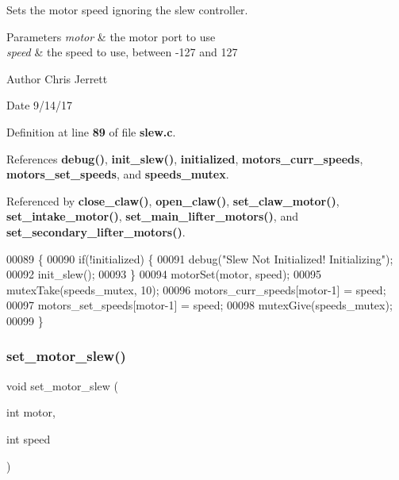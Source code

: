 Sets the motor speed ignoring the slew controller. 


\begin{DoxyParams}{Parameters}
{\em motor} & the motor port to use \\
\hline
{\em speed} & the speed to use, between -\/127 and 127 \\
\hline
\end{DoxyParams}
\begin{DoxyAuthor}{Author}
Chris Jerrett 
\end{DoxyAuthor}
\begin{DoxyDate}{Date}
9/14/17 
\end{DoxyDate}


Definition at line \textbf{ 89} of file \textbf{ slew.\+c}.



References \textbf{ debug()}, \textbf{ init\+\_\+slew()}, \textbf{ initialized}, \textbf{ motors\+\_\+curr\+\_\+speeds}, \textbf{ motors\+\_\+set\+\_\+speeds}, and \textbf{ speeds\+\_\+mutex}.



Referenced by \textbf{ close\+\_\+claw()}, \textbf{ open\+\_\+claw()}, \textbf{ set\+\_\+claw\+\_\+motor()}, \textbf{ set\+\_\+intake\+\_\+motor()}, \textbf{ set\+\_\+main\+\_\+lifter\+\_\+motors()}, and \textbf{ set\+\_\+secondary\+\_\+lifter\+\_\+motors()}.


\begin{DoxyCode}
00089                                                \{
00090   \textcolor{keywordflow}{if}(!initialized) \{
00091     debug(\textcolor{stringliteral}{"Slew Not Initialized! Initializing"});
00092     init_slew();
00093   \}
00094   motorSet(motor, speed);
00095   mutexTake(speeds_mutex, 10);
00096   motors_curr_speeds[motor-1] = speed;
00097   motors_set_speeds[motor-1] = speed;
00098   mutexGive(speeds_mutex);
00099 \}
\end{DoxyCode}
\mbox{\label{slew_8c_a7dff2b79dffe55fb936d977594d7c01d}} 
\subsubsection{set\+\_\+motor\+\_\+slew()}
{\footnotesize\ttfamily void set\+\_\+motor\+\_\+slew (\begin{DoxyParamCaption}\item[{int}]{motor,  }\item[{int}]{speed }\end{DoxyParamCaption})}



